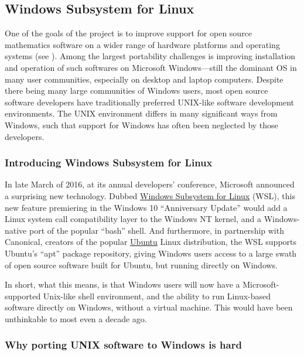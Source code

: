 \documentclass{deliverablereport}
\begin{document}
\subsection{Windows Subsystem for Linux}
\label{sec:winix}

One of the goals of the \ODK project is to improve support for open
source mathematics software on a wider range of hardware platforms and
operating systems (see ).
Among the largest portability challenges is improving installation and
operation of such softwares on Microsoft Windows---still the dominant
OS in many user communities, especially on desktop and laptop
computers.  Despite there being many large communities of Windows
users, most open source software developers have traditionally
preferred UNIX-like software development environments.  The UNIX
environment differs in many significant ways from Windows, such that
support for Windows has often been neglected by those developers.


\subsubsection{Introducing Windows Subsystem for Linux}

In late March of 2016, at its annual developers' conference, Microsoft
announced a surprising new technology.  Dubbed
\href{https://msdn.microsoft.com/commandline/wsl/about}{Windows
  Subsystem for Linux} (WSL), this new feature premiering in the
Windows 10 ``Anniversary Update'' would add a Linux system call
compatibility layer to the Windows NT kernel, and a Windows-native
port of the popular ``bash'' shell.  And furthermore, in partnership
with Canonical, creators of the popular
\href{http://www.ubuntu.com/}{Ubuntu} Linux distribution, the WSL
supports Ubuntu's ``apt'' package repository, giving Windows users
access to a large swath of open source software built for Ubuntu, but
running directly on Windows.

In short, what this means, is that Windows users will now have a
Microsoft-supported Unix-like shell environment, and the ability to
run Linux-based software directly on Windows, without a virtual
machine.  This would have been unthinkable to most even a decade ago.


\subsubsection{Why porting UNIX software to Windows is hard}
\end{document}
